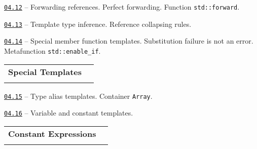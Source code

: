 \documentclass[a4paper,12pt]{article}
\renewenvironment{itemize}
{
    \begin{list}{\labelitemi}
    {
      \setlength{\topsep}{0pt}
      \setlength{\partopsep}{0pt}
      \setlength{\parskip}{0pt}
      \setlength{\itemsep}{0pt}
      \setlength{\parsep}{0pt}
      \setlength{\leftmargin}{14.5pt}
    }
}{\end{list}}
\begin{document}
\begin{itemize}

    \item \href{https://github.com/i-s-m-mipt/Education/blob/master/projects/examples/source/04.12.cpp}{\texttt{04.12}} -- Forwarding references. Perfect forwarding. Function \lstinline{std::forward}.

    \smallskip

    \item \href{https://github.com/i-s-m-mipt/Education/blob/master/projects/examples/source/04.13.cpp}{\texttt{04.13}} -- Template type inference. Reference collapsing rules.

    \smallskip

    \item \href{https://github.com/i-s-m-mipt/Education/blob/master/projects/examples/source/04.14.cpp}{\texttt{04.14}} -- Special member function templates. Substitution failure is not an error. Metafunction \lstinline{std::enable_if}.

\end{itemize}

\bigskip\medskip

\begin{tabular}{!{\vrule width 1pt}L{3.6cm}!{\vrule width 1pt}L{15.4cm}!{\vrule width 0pt}} 


\textbf{Special Templates} & \\


\end{tabular}

\medskip\smallskip

\begin{itemize}

    \item \href{https://github.com/i-s-m-mipt/Education/blob/master/projects/examples/source/04.15.cpp}{\texttt{04.15}} -- Type alias templates. Container \lstinline{Array}.

    \smallskip

    \item \href{https://github.com/i-s-m-mipt/Education/blob/master/projects/examples/source/04.16.cpp}{\texttt{04.16}} -- Variable and constant templates.

\end{itemize}

\bigskip\medskip

\begin{tabular}{!{\vrule width 1pt}L{4.2cm}!{\vrule width 1pt}L{14.8cm}!{\vrule width 0pt}} 


\textbf{Constant Expressions} & \\


\end{tabular}
\end{document}
